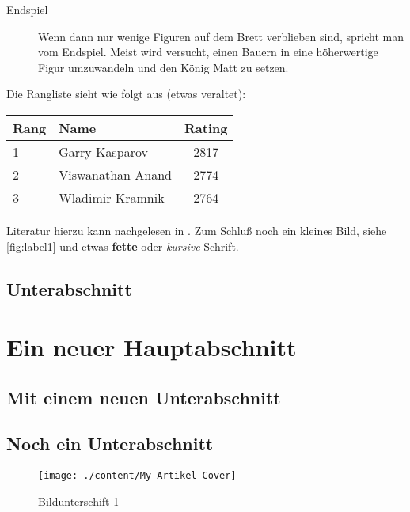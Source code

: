\begin{refsection}
\begin{description}
  \item[Endspiel] 
  Wenn dann nur wenige Figuren auf dem Brett verblieben sind, spricht man vom Endspiel. 
  Meist wird versucht, einen Bauern in eine höherwertige Figur umzuwandeln und den König Matt zu setzen.
\end{description}
Die Rangliste sieht wie folgt aus (etwas veraltet):
\begin{center}
  \begin{tabular}{llc}
    Rang & Name              & Rating \\\hline
    1    & Garry Kasparov    & 2817   \\
    2    & Viswanathan Anand & 2774   \\
    3    & Wladimir Kramnik  & 2764
  \end{tabular}
\end{center}
Literatur hierzu kann nachgelesen in \textcite{brunel:1999}. 
Zum Schluß noch ein kleines Bild, siehe \vref{fig:label1} und etwas \textbf{fette} oder \emph{kursive} Schrift.

\subsection{Unterabschnitt}
\blindtext[2]

\section*{Ein neuer Hauptabschnitt}
\subsection{Mit einem neuen Unterabschnitt}
\lipsum[1]

\subsubsection{} 
\lipsum[1]

\subsubsection{} 
\lipsum[1]
\subsection{Noch ein Unterabschnitt}
\lipsum[4-6]

\begin{figure}[t]
  \begin{center}
  \texttt{[image: ./content/My-Artikel-Cover]}
  \caption{Bildunterschift 1}\label{fig:label1}		%
  \end{center}
\end{figure}

\printbibliography
\end{refsection}

